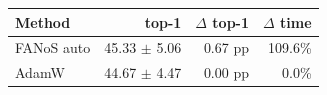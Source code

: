 \begin{tabular}{lrrr}
\toprule
Method & top-1 & $\Delta$ top-1 & $\Delta$ time \\
\midrule
FANoS auto & 45.33 $\pm$ 5.06 & 0.67 pp & 109.6\% \\
AdamW & 44.67 $\pm$ 4.47 & 0.00 pp & 0.0\% \\
\bottomrule
\end{tabular}
